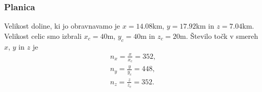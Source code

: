 \documentclass[mat2, tisk]{fmfdelo}
\begin{document}

\newpage
\subsubsection{Planica}

Velikost doline, ki jo obravnavamo je 
$x = 14.08$km, $y = 17.92$km in $z = 7.04$km. Velikost celic smo izbrali
$x_c=40$m, $y_c=40$m in $z_c=20$m. Število točk v smereh $x$, $y$ in $z$ je 
\begin{align*}
n_x = \frac{x}{x_c} = 352, \\
n_y = \frac{y}{y_c} = 448, \\
n_z = \frac{z}{z_c} = 352.
\end{align*}
\end{document}

